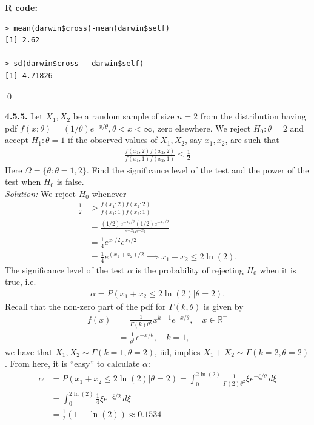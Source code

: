 \documentclass{book}
\theoremstyle{definition}
\newcommand{\nn}{\nonumber}
\newcommand{\f}[2]{\frac{#1}{#2}}
\begin{document}
\textbf{R code:}
\begin{lstlisting}
> mean(darwin$cross)-mean(darwin$self)
[1] 2.62

> sd(darwin$cross - darwin$self)
[1] 4.71826
\end{lstlisting}
\qed










\newpage
\noindent\textbf{4.5.5.} Let $X_1, X_2$ be a random sample of size $n = 2$ from the distribution having
pdf $f(x; \theta) = (1/\theta)e^{-x/\theta}, \theta <x< \infty$, zero elsewhere. We reject $H_0 : \theta = 2$ and
accept $H_1 : \theta = 1$ if the observed values of $X_1, X_2$, say $x_1, x_2$, are such that
\begin{align}
\f{f(x_1;2)f(x_2;2)}{f(x_1;1)f(x_2;1)} \leq \f{1}{2}
\end{align}
Here $\Omega = \{\theta : \theta = 1, 2\}$. Find the significance level of the test and the power of the
test when $H_0$ is false.\\



\noindent \textit{Solution:}  We reject $H_0$ whenever
\begin{align}
\f{1}{2} &\geq \f{f(x_1;2)f(x_2;2)}{f(x_1;1)f(x_2;1)}\nn\\
&=\f{(1/2)e^{-x_1/2}(1/2)e^{-x_2/2}}{e^{-x_1}e^{-x_2}} \nn\\
&= \f{1}{4}e^{x_1/2}e^{x_2/2}\nn\\
&= \f{1}{4}e^{(x_1+x_2)/2} \implies x_1+x_2 \leq 2\ln(2). 
\end{align}
The significance level of the test $\alpha$ is the probability of rejecting $H_0$ when it is true, i.e.
\begin{align}
\alpha = P(x_1+x_2 \leq 2\ln(2)\vert \theta = 2).
\end{align} 
Recall that the non-zero part of the pdf for $\Gamma(k,\theta)$ is given by
\begin{align}
f(x) &= \f{1}{\Gamma(k)\theta^k}x^{k-1}e^{-x/\theta}, \quad x\in \mathbb{R}^+\nn\\
&= \f{1}{\theta^1}e^{-x/\theta}, \quad k=1,
\end{align}
we have that $X_1,X_2 \sim \Gamma(k=1,\theta=2)$, iid, implies $X_1+X_2 \sim \Gamma(k= 2, \theta = 2)$. From here, it is ``easy'' to calculate $\alpha$:
\begin{align}
\alpha &= P(x_1+x_2 \leq 2\ln(2)\vert \theta = 2) = \int^{2\ln(2)}_0 \f{1}{\Gamma(2)\theta^2}\xi e^{-\xi/\theta}\,d\xi\nn\\
&= \int^{2\ln(2)}_0 \f{1}{4}\xi e^{-\xi/2}\,d\xi\nn\\
&= \f{1}{2}(1-\ln(2)) \approx \boxed{0.1534}
\end{align}
\end{document}
